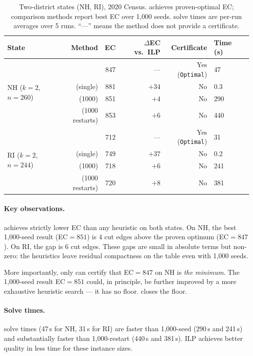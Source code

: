\begin{table}[t]
\centering
\caption{%
  Two-district states (NH, RI), 2020 Census.
  \ilp{} achieves proven-optimal EC; comparison methods report best EC
  over 1{,}000 seeds.
  \ilp{} solve times are per-run averages over 5 runs.
  ``---'' means the method does not provide a certificate.
}
\label{tab:nh-ri}
\renewcommand{\arraystretch}{1.3}
\begin{tabular}{@{}lrrrrll@{}}
\toprule
State & Method & EC & $\Delta$EC vs.\ ILP & Certificate & Time (s) \\
\midrule
\multirow{4}{*}{NH ($k=2$, $n=260$)}
 & \ilp{}               & 847 & ---   & Yes (\texttt{Optimal}) & 47 \\
 & \metis{} (single)    & 881 & $+34$ & No                     & 0.3 \\
 & \metis{} \be{}(1000) & 851 & $+4$  & No                     & 290 \\
 & \sa{} (1000 restarts)& 853 & $+6$  & No                     & 440 \\
\midrule
\multirow{4}{*}{RI ($k=2$, $n=244$)}
 & \ilp{}               & 712 & ---   & Yes (\texttt{Optimal}) & 31 \\
 & \metis{} (single)    & 749 & $+37$ & No                     & 0.2 \\
 & \metis{} \be{}(1000) & 718 & $+6$  & No                     & 241 \\
 & \sa{} (1000 restarts)& 720 & $+8$  & No                     & 381 \\
\bottomrule
\end{tabular}
\end{table}

\paragraph{Key observations.}
\ilp{} achieves strictly lower EC than any heuristic on both states.
On NH, the best 1{,}000-seed \be{} result (EC$= 851$) is 4 cut edges
above the proven optimum (EC$= 847$).
On RI, the gap is 6 cut edges.
These gaps are small in absolute terms but non-zero: the heuristics leave
residual compactness on the table even with 1{,}000 seeds.

More importantly, only \ilp{} can certify that EC$= 847$ on NH is
\emph{the minimum}.
The 1{,}000-seed \be{} result EC$= 851$ could, in principle, be further
improved by a more exhaustive heuristic search --- it has no floor.
\ilp{} closes the floor.

\paragraph{Solve times.}
\ilp{} solve times (47\,s for NH, 31\,s for RI) are faster than 1{,}000-seed
\be{} (290\,s and 241\,s) and substantially faster than 1{,}000-restart
\sa{} (440\,s and 381\,s).
ILP achieves better quality in less time for these instance sizes.

